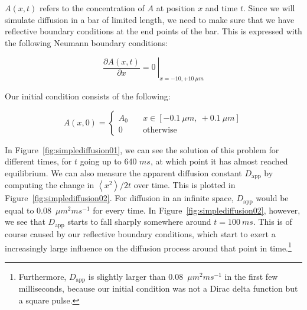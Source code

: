 \documentclass[a4paper,12pt]{book}
\begin{document}
$A(x,t)$ refers to the concentration of $A$ at position $x$ and time $t$. Since we will simulate diffusion in a bar of limited length, we need to make sure that we have reflective boundary conditions at the end points of the bar. This is expressed with the following Neumann boundary conditions:

\begin{equation}\label{eqn:simplediffusion02}
\left.\frac{\partial A(x,t)}{\partial x} = 0\ \right|_{x=-10,+10\ \mu m}
\end{equation}

Our initial condition consists of the following: 

\begin{equation}\label{eqn:simplediffusion03}
A(x,0) =
\left\{
\begin{aligned}
A_0 \quad & x \in [-0.1\ \mu m,\ +0.1\ \mu m]\\
0 \quad & \text{otherwise}
\end{aligned}
\right.
\end{equation}

In Figure~\ref{fig:simplediffusion01}, we can see the solution of this problem for different times, for $t$ going up to 640 $ms$, at which point it has almost reached equilibrium. We can also measure the apparent diffusion constant $D_\text{app}$ by computing the change in $\left< x^2 \right> / 2 t$ over time. This is plotted in Figure~\ref{fig:simplediffusion02}. For diffusion in an infinite space, $D_\text{app}$ would be equal to 0.08~$\mu m^{2}ms^{-1}$ for every time. In Figure~\ref{fig:simplediffusion02}, however, we see that $D_\text{app}$ starts to fall sharply somewhere around $t = 100\ ms$. This is of course caused by our reflective boundary conditions, which start to exert a increasingly large influence on the diffusion process around that point in time.\footnote{Furthermore, $D_\text{app}$ is slightly larger than 0.08~$\mu m^{2}ms^{-1}$ in the first few milliseconds, because our initial condition was not a Dirac delta function but a square pulse.}
\end{document}
